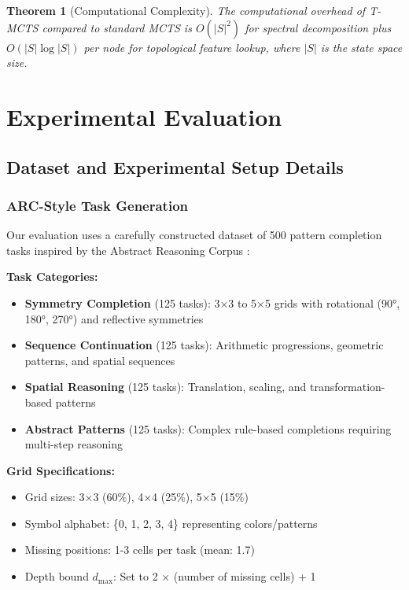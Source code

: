 \documentclass{article}
\newtheorem{theorem}{Theorem}
\begin{document}
\begin{theorem}[Computational Complexity]
The computational overhead of T-MCTS compared to standard MCTS is $O(|S|^2)$ for spectral decomposition plus $O(|S| \log |S|)$ per node for topological feature lookup, where $|S|$ is the state space size.
\end{theorem}

\section{Experimental Evaluation}

\subsection{Dataset and Experimental Setup Details}

\subsubsection{ARC-Style Task Generation}
Our evaluation uses a carefully constructed dataset of 500 pattern completion tasks inspired by the Abstract Reasoning Corpus \citep{chollet2019measure}:

\textbf{Task Categories:}
\begin{itemize}
\item \textbf{Symmetry Completion} (125 tasks): 3×3 to 5×5 grids with rotational (90°, 180°, 270°) and reflective symmetries
\item \textbf{Sequence Continuation} (125 tasks): Arithmetic progressions, geometric patterns, and spatial sequences  
\item \textbf{Spatial Reasoning} (125 tasks): Translation, scaling, and transformation-based patterns
\item \textbf{Abstract Patterns} (125 tasks): Complex rule-based completions requiring multi-step reasoning
\end{itemize}

\textbf{Grid Specifications:}
\begin{itemize}
\item Grid sizes: 3×3 (60\%), 4×4 (25\%), 5×5 (15\%)
\item Symbol alphabet: \{0, 1, 2, 3, 4\} representing colors/patterns
\item Missing positions: 1-3 cells per task (mean: 1.7)
\item Depth bound $d_{\max}$: Set to 2 × (number of missing cells) + 1
\end{itemize}
\end{document}
